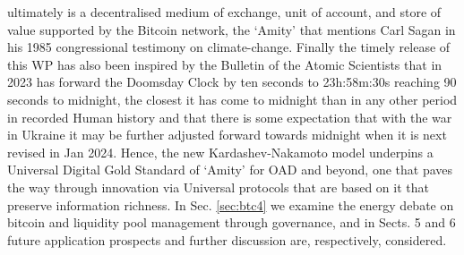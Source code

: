 \documentclass[final,5p,times,twocolumn,authoryear]{elsarticle}
\begin{document}
ultimately is a decentralised medium of exchange, unit of account, and store of value supported by the Bitcoin network, the `Amity' that mentions Carl Sagan in his 1985 congressional testimony on climate-change. Finally the timely release of this WP has also been inspired by the Bulletin of the Atomic Scientists that in 2023 has forward the Doomsday Clock by ten seconds to 23h:58m:30s reaching 90 seconds to midnight, the closest it has come to midnight than in any other period in recorded Human history and that there is some expectation that with the war in Ukraine it may be further adjusted forward towards midnight when it is next revised in Jan 2024. Hence, the new Kardashev-Nakamoto model underpins a Universal Digital Gold Standard of `Amity' for OAD and beyond, one that paves the way through innovation via Universal protocols that are based on it that preserve information richness.  In Sec. \ref{sec:btc4} we examine the energy debate on bitcoin and liquidity pool management through governance, and in Sects. 5 and 6 future application prospects and further discussion are, respectively, considered.


\end{document}
